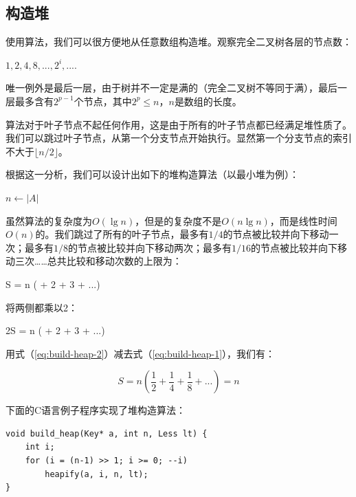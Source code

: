 \documentclass[b5paper]{ctexart}
\begin{document}
\subsection{构造堆}

使用算法，我们可以很方便地从任意数组构造堆。观察完全二叉树各层的节点数：

$1, 2, 4, 8, ..., 2^i, ...$.

唯一例外是最后一层，由于树并不一定是满的（完全二叉树不等同于满），最后一层最多含有$2^{p-1}$个节点，其中$2^p \leq n$，$n$是数组的长度。

算法对于叶子节点不起任何作用，这是由于所有的叶子节点都已经满足堆性质了。我们可以跳过叶子节点，从第一个分支节点开始执行。显然第一个分支节点的索引不大于$\lfloor n/2 \rfloor$。

根据这一分析，我们可以设计出如下的堆构造算法（以最小堆为例）：

\begin{algorithmic}[1]
  \State $n \gets |A|$
    \State {}
  \EndFor
\EndFunction
\end{algorithmic}

虽然算法的复杂度为$O(\lg n)$，但是的复杂度不是$O(n \lg n)$，而是线性时间$O(n)$的。我们跳过了所有的叶子节点，最多有$1/4$的节点被比较并向下移动一次；最多有$1/8$的节点被比较并向下移动两次；最多有$1/16$的节点被比较并向下移动三次……总共比较和移动次数的上限为：

\be
S = n ( + 2  + 3  + ...)
\label{eq:build-heap-1}
\ee

将两侧都乘以2：

\be
2S = n ( + 2  + 3  + ...)
\label{eq:build-heap-2}
\ee

用式（\ref{eq:build-heap-2}）减去式（\ref{eq:build-heap-1}），我们有：

\[
S = n (\frac{1}{2} + \frac{1}{4} + \frac{1}{8} + ...) = n
\]

下面的C语言例子程序实现了堆构造算法：

\lstset{language=C}
\begin{lstlisting}
void build_heap(Key* a, int n, Less lt) {
    int i;
    for (i = (n-1) >> 1; i >= 0; --i)
        heapify(a, i, n, lt);
}
\end{lstlisting}
\end{document}
